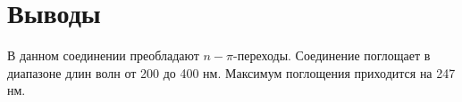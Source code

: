 \section{Выводы}
В данном соединении преобладают $n-\pi$-переходы. Соединение поглощает в диапазоне длин волн от 200 до 400 нм. Максимум поглощения приходится на 247 нм.